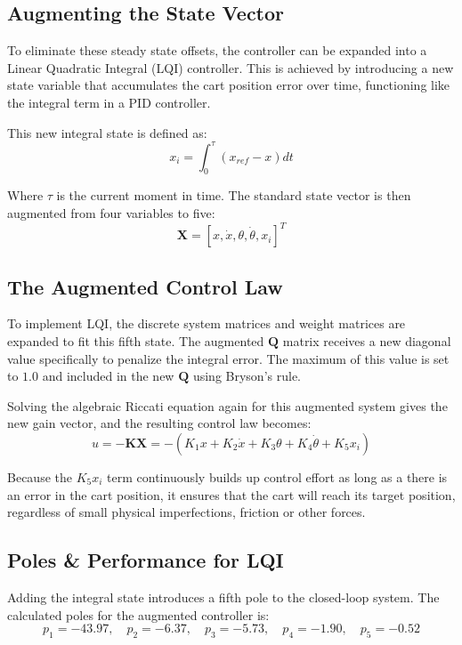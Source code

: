 \subsection{Augmenting the State Vector}
To eliminate these steady state offsets, the controller can be expanded into a Linear Quadratic Integral (LQI) controller. This is achieved by introducing a new state variable that accumulates the cart position error over time, functioning like the integral term in a PID controller.

This new integral state is defined as:
\begin{equation}
	\label{LQI cart error value}
	x_i = \int_{0}^{\tau} (x_{ref} - x) dt
\end{equation}

Where $\tau$ is the current moment in time. The standard state vector is then augmented from four variables to five:
\begin{equation}
	\label{LQI augmented state}
	\textbf{X} = \left[ x, \dot{x}, \theta, \dot{\theta}, x_i \right]^T
\end{equation}

\subsection{The Augmented Control Law}
To implement LQI, the discrete system matrices and weight matrices are expanded to fit this fifth state. The augmented $\textbf{Q}$ matrix receives a new diagonal value specifically to penalize the integral error. The maximum of this value is set to $1.0$ and included in the new $\textbf{Q}$ using Bryson's rule. 

Solving the algebraic Riccati equation again for this augmented system gives the new gain vector, and the resulting control law becomes:
\begin{equation}
	\label{LQI control law}
	u = -\textbf{K} \textbf{X} = -(K_1 x + K_2 \dot{x} + K_3 \theta + K_4 \dot{\theta} + K_5 x_i)
\end{equation}

Because the $K_5 x_i$ term continuously builds up control effort as long as a there is an error in the cart position, it ensures that the cart will reach its target position, regardless of small physical imperfections, friction or other forces.

\subsection{Poles \& Performance for LQI} \label{Performance LQI}
Adding the integral state introduces a fifth pole to the closed-loop system. The calculated poles for the augmented controller is:
\begin{equation}
	p_1 = -43.97, \quad p_2 = -6.37, \quad p_3 = -5.73, \quad p_4 = -1.90, \quad p_5 = -0.52
\end{equation}

